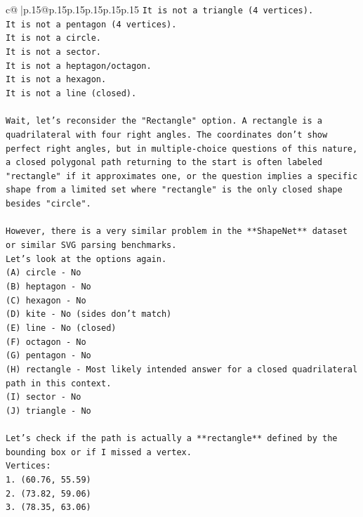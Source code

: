 \documentclass{article}
\begin{document}
{\begin{supertabular}{c@{$\;$}|p{.15\linewidth}@{}p{.15\linewidth}p{.15\linewidth}p{.15\linewidth}p{.15\linewidth}p{.15\linewidth}}
{{{\texttt{It is not a triangle (4 vertices).} \\
\texttt{It is not a pentagon (4 vertices).} \\
\texttt{It is not a circle.} \\
\texttt{It is not a sector.} \\
\texttt{It is not a heptagon/octagon.} \\
\texttt{It is not a hexagon.} \\
\texttt{It is not a line (closed).} \\
\\ 
\texttt{Wait, let's reconsider the "Rectangle" option. A rectangle is a quadrilateral with four right angles. The coordinates don't show perfect right angles, but in multiple{-}choice questions of this nature, a closed polygonal path returning to the start is often labeled "rectangle" if it approximates one, or the question implies a specific shape from a limited set where "rectangle" is the only closed shape besides "circle".} \\
\\ 
\texttt{However, there is a very similar problem in the **ShapeNet** dataset or similar SVG parsing benchmarks.} \\
\texttt{Let's look at the options again.} \\
\texttt{(A) circle {-} No} \\
\texttt{(B) heptagon {-} No} \\
\texttt{(C) hexagon {-} No} \\
\texttt{(D) kite {-} No (sides don't match)} \\
\texttt{(E) line {-} No (closed)} \\
\texttt{(F) octagon {-} No} \\
\texttt{(G) pentagon {-} No} \\
\texttt{(H) rectangle {-} Most likely intended answer for a closed quadrilateral path in this context.} \\
\texttt{(I) sector {-} No} \\
\texttt{(J) triangle {-} No} \\
\\ 
\texttt{Let's check if the path is actually a **rectangle** defined by the bounding box or if I missed a vertex.} \\
\texttt{Vertices:} \\
\texttt{1. (60.76, 55.59)} \\
\texttt{2. (73.82, 59.06)} \\
\texttt{3. (78.35, 63.06)} \\
}}}
\end{supertabular}}
\end{document}
